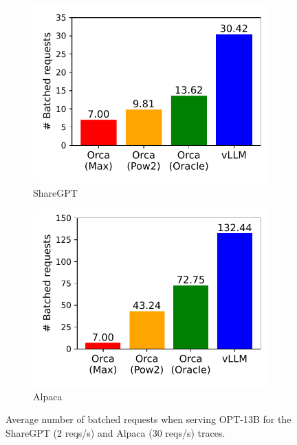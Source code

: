 \begin{figure}[t]
     \centering
     \begin{subfigure}[t]{0.48\linewidth}
         \centering
         \includegraphics[width=\columnwidth]{figures/experiments/batched_requests_sharegpt.pdf}
         \vspace{-20pt}
         \caption{\small ShareGPT}
     \label{fig:batch-sharegpt}
     \end{subfigure}%
     \begin{subfigure}[t]{0.48\linewidth}
         \centering
         \includegraphics[width=\columnwidth]{figures/experiments/batched_requests_alpaca.pdf}
         \vspace{-20pt}
         \caption{\small Alpaca}
     \label{fig:batch-alpaca}
     \end{subfigure}%
     \vspace{-8pt}
     \caption{Average number of batched requests when serving OPT-13B for the ShareGPT (2 reqs/s) and Alpaca (30 reqs/s) traces.}
\vspace{-15pt}
\end{figure}

